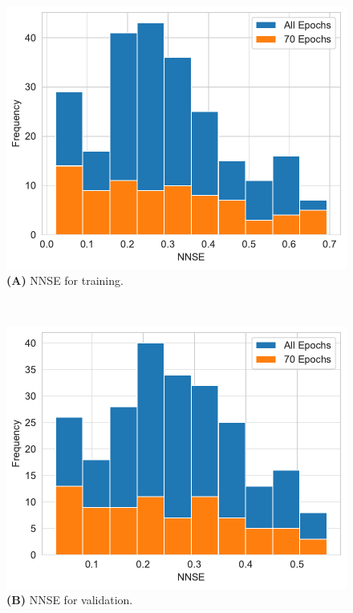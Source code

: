 \documentclass[utf8]{FrontiersinVancouver} %
\begin{document}
{\begin{figure}[p]
  \begin{center}
     \begin{minipage}[t]{0.65\textwidth}
        \includegraphics[width=1.0\linewidth]{images/frequency_nnse_histogram_70_training.pdf}
        {\bf (A)} NNSE for training.
     \end{minipage}
  \end{center}
  \ \
  \begin{center}
     \begin{minipage}[t]{0.65\textwidth}
        \includegraphics[width=1.0\linewidth]{images/frequency_nnse_histogram_70_validation.pdf}
        {\bf (B)} NNSE for validation.
     \end{minipage}
  \end{center}


\end{figure}}
\end{document}
